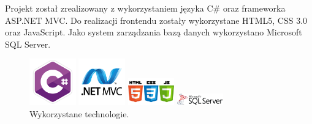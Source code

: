 \documentclass{article}
\begin{document}
Projekt został zrealizowany z wykorzystaniem języka C\# oraz frameworka ASP.NET MVC. Do realizacji frontendu zostały wykorzystane HTML5, CSS 3.0 oraz JavaScript. Jako system zarządzania bazą danych wykorzystano Microsoft SQL Server.

\begin{figure}[h]
\centering
		\begin{minipage}{2cm}
			\includegraphics[width=2cm]{c_hasztag.png}
		\end{minipage}
		\begin{minipage}{2cm}
			\includegraphics[width=2cm]{asp_net-MVC.png}
		\end{minipage}
		\begin{minipage}{2cm}
			\includegraphics[width=2cm]{html.png}
		\end{minipage}
		\begin{minipage}{2cm}
			\includegraphics[width=2cm]{sql.png}
		\end{minipage}
	\caption{Wykorzystane technologie.}
	\label{fig:technologie}
\end{figure}
\end{document}
